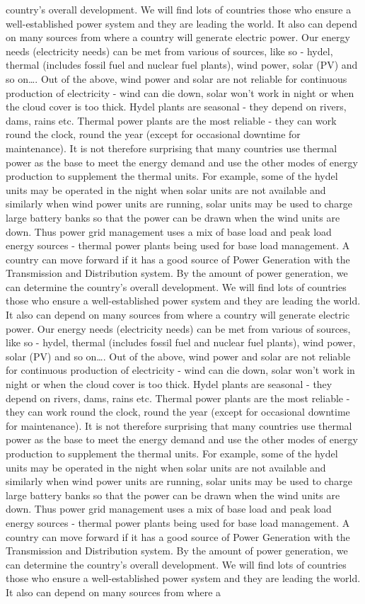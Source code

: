 \documentclass[10pt, a4paper]{article}
\begin{document}
country’s overall development. We will find lots of countries those who ensure a well-established power system and they are leading the world. It also can depend on many sources from where a country will generate electric power. Our energy needs (electricity needs) can be met from various of sources, like so - hydel, thermal (includes fossil fuel and nuclear fuel plants), wind power, solar (PV) and so on\dots. Out of the above, wind power and solar are not reliable for continuous production of electricity - wind can die down, solar won’t work in night or when the cloud cover is too thick. Hydel plants are seasonal - they depend on rivers, dams, rains etc. Thermal power plants are the most reliable - they can work round the clock, round the year (except for occasional downtime for maintenance). It is not therefore surprising that many countries use thermal power as the base to meet the energy demand and use the other modes of energy production to supplement the thermal units. For example, some of the hydel units may be operated in the night when solar units are not available and similarly when wind power units are running, solar units may be used to charge large battery banks so that the power can be drawn when the wind units are down. Thus power grid management uses a mix of base load and peak load energy sources - thermal power plants being used for base load management. A country can move forward if it has a good source of Power Generation with the Transmission and Distribution system. By the amount of power generation, we can determine the country’s overall development. We will find lots of countries those who ensure a well-established power system and they are leading the world. It also can depend on many sources from where a country will generate electric power. Our energy needs (electricity needs) can be met from various of sources, like so - hydel, thermal (includes fossil fuel and nuclear fuel plants), wind power, solar (PV) and so on\dots. Out of the above, wind power and solar are not reliable for continuous production of electricity - wind can die down, solar won’t work in night or when the cloud cover is too thick. Hydel plants are seasonal - they depend on rivers, dams, rains etc. Thermal power plants are the most reliable - they can work round the clock, round the year (except for occasional downtime for maintenance). It is not therefore surprising that many countries use thermal power as the base to meet the energy demand and use the other modes of energy production to supplement the thermal units. For example, some of the hydel units may be operated in the night when solar units are not available and similarly when wind power units are running, solar units may be used to charge large battery banks so that the power can be drawn when the wind units are down. Thus power grid management uses a mix of base load and peak load energy sources - thermal power plants being used for base load management. A country can move forward if it has a good source of Power Generation with the Transmission and Distribution system. By the amount of power generation, we can determine the country’s overall development. We will find lots of countries those who ensure a well-established power system and they are leading the world. It also can depend on many sources from where a 
\end{document}
